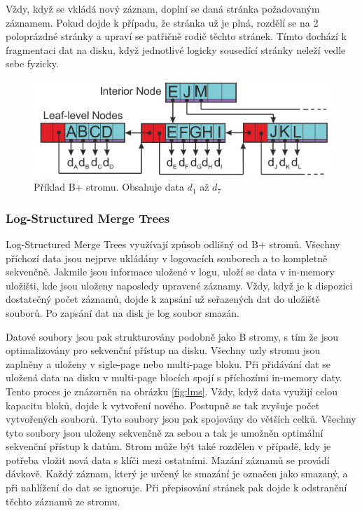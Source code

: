 \documentclass[thesis=M,czech]{FITthesis}[2012/06/26]
\begin{document}
Vždy, když se vkládá nový záznam, doplní se daná stránka požadovaným záznamem. Pokud dojde k případu, že stránka už je plná, rozdělí se na 2 poloprázdné stránky a upraví se patřičně rodič těchto stránek. Tímto dochází k fragmentaci dat na disku, když jednotlivé logicky sousedící stránky neleží vedle sebe fyzicky.
\begin{figure}\centering
	\includegraphics[width=1\textwidth, angle=0]{files/Bplustree}
	\caption[Příklad B+ stromu.]{Příklad B+ stromu. Obsahuje data $d_1$ až $d_7$}\label{fig:btree}
\end{figure}


\subsubsection{Log-Structured Merge Trees}
Log-Structured Merge Trees využívají způsob odlišný od B+ stromů. Všechny příchozí data jsou nejprve ukládány v logovacích souborech a to kompletně sekvenčně. Jakmile jsou informace uložené v logu, uloží se data v in-memory uložišti, kde jsou uloženy naposledy upravené záznamy. Vždy, když je k dispozici dostatečný počet záznamů, dojde k zapsání už seřazených dat do uložiště souborů. Po zapsání dat na disk je log soubor smazán. 


Datové soubory jsou pak strukturovány podobně jako B stromy, s tím že jsou optimalizovány pro sekvenční přístup na disku. Všechny uzly stromu jsou zaplněny a uloženy v sigle-page nebo multi-page bloku. Při přidávání dat se uložená data na disku v multi-page blocích spojí s příchozími in-memory daty. Tento proces je znázorněn na obrázku \ref{fig:lms}.  Vždy, když data využijí celou kapacitu bloků, dojde k vytvoření nového.
Postupně se tak zvyšuje počet vytvořených souborů. Tyto soubory jsou pak spojovány do větších celků. Všechny tyto soubory jsou uloženy sekvenčně za sebou a tak je umožněn optimální sekvenční přístup k datům.
Strom může být také rozdělen v případě, kdy je potřeba vložit nová data s klíči mezi ostatními.
Mazání záznamů se provádí dávkově. Každý záznam, který je určený ke smazání je označen jako smazaný, a při nahlížení do dat se ignoruje. Při přepisování stránek pak dojde k odstranění těchto záznamů ze stromu.
\end{document}
